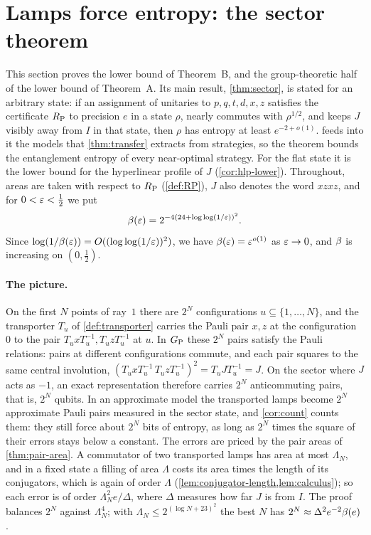 \section{Lamps force entropy: the sector theorem}\label{sec:sector}

This section proves the lower bound of Theorem~B, and the group-theoretic half of the lower bound of Theorem~A. Its main result,
\cref{thm:sector}, is stated for an arbitrary state: if an assignment of unitaries to $p,q,t,d,x,z$ satisfies the certificate $R_{\mathrm P}$ to
precision $e$ in a state $\rho$, nearly commutes with $\rho^{1/2}$, and keeps $J$ visibly away from $I$ in that state, then $\rho$ has
entropy at least $e^{-2+o(1)}$.  feeds into it the models that \cref{thm:transfer} extracts from strategies, so the
theorem bounds the entanglement entropy of every near-optimal strategy. For the flat state it is the lower bound for the hyperlinear
profile of $J$ (\cref{cor:hlp-lower}). Throughout, areas are taken with respect to $R_{\mathrm P}$ (\cref{def:RP}), $J$ also denotes the word
$xzxz$, and for $0<\varepsilon<\frac12$ we put
\begin{equation}\label{eq:sector-bfun}
\beta(\varepsilon)=2^{-4(24+\log\log(1/\varepsilon))^2}.
\end{equation}
Since $\log(1/\beta(\varepsilon))=O((\log\log(1/\varepsilon))^2)$, we have $\beta(\varepsilon)=\varepsilon^{o(1)}$ as $\varepsilon\to0$, and $\beta$ is increasing on
$(0,\frac12)$.

\paragraph{The picture.} On the first $N$ points of ray~$1$ there are $2^N$ configurations $u\subseteq\{1,\dots,N\}$, and the transporter
$T_u$ of \cref{def:transporter} carries the Pauli pair $x,z$ at the configuration $0$ to the pair $T_uxT_u^{-1},T_uzT_u^{-1}$ at $u$. In
$G_{\mathrm P}$ these $2^N$ pairs satisfy the Pauli relations: pairs at different configurations commute, and each pair squares to the same central
involution, $(T_uxT_u^{-1}\,T_uzT_u^{-1})^2=T_uJT_u^{-1}=J$. On the sector where $J$ acts as $-1$, an exact representation therefore
carries $2^N$ anticommuting pairs, that is, $2^N$ qubits. In an approximate model the transported lamps become $2^N$ approximate Pauli
pairs measured in the sector state, and \cref{cor:count} counts them: they still force about $2^N$ bits of entropy, as long as $2^N$ times
the square of their errors stays below a constant. The errors are priced by the pair areas of \cref{thm:pair-area}. A commutator of two
transported lamps has area at most $\Lambda_N$, and in a fixed state a filling of area $\Lambda$ costs its area times the length of its
conjugators, which is again of order $\Lambda$ (\cref{lem:conjugator-length,lem:calculus}); so each error is of order
$\Lambda_N^2e/\Delta$, where $\Delta$ measures how far $J$ is from $I$. The proof balances $2^N$ against $\Lambda_N^4$; with
$\Lambda_N\le2^{(\log N+23)^2}$ the best $N$ has $2^N\approx\Delta^2e^{-2}\beta(e)$.


